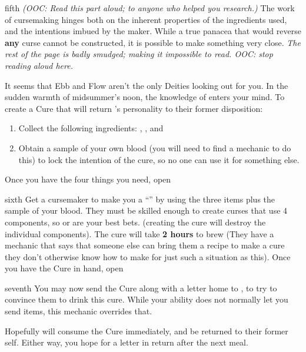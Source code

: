\documentclass[notebook]{GL2020} %
\begin{document}
\begin{page}{fifth}
\emph{(OOC: Read this part aloud; to anyone who helped you research.)} The work of cursemaking hinges both on the inherent properties of the ingredients used, and the intentions imbued by the maker. While a true panacea that would reverse \textbf{any} curse cannot be constructed, it is possible to make something very close. \emph{The rest of the page is badly smudged; making it impossible to read. OOC: stop reading aloud here.}

It seems that Ebb and Flow aren’t the only Deities looking out for you. In the sudden warmth of midsummer’s noon, the knowledge of \cFarmGod{} enters your mind. To create a Cure that will return \cLoud{}’s personality to their former disposition:
\begin{enumerate}
	\item Collect the following ingredients: \iFish{}, \iCharcoal{}, and \iSight{}
	\item  Obtain a sample of your own blood (you will need to find a mechanic to do this) to lock the intention of the cure, so no one can use it for something else.
\end{enumerate}

Once you have the four things you need, open 
\end{page}

\begin{page}{sixth}
Get a cursemaker to make you a ``\iPanacea{}'' by using the three items plus the sample of your blood. They must be skilled enough to create curses that use 4 components, so \cPrince{} or \cCurse{} are your best bets. (creating the cure will destroy the individual components). The cure will take \textbf{2 hours} to brew (They have a mechanic that says that someone else can bring them a recipe to make a cure they don’t otherwise know how to make for just such a situation as this). Once you have the Cure in hand, open 
\end{page}

\begin{page}{seventh}
You may now send the Cure along with a letter home to \cLoud{}, to try to convince them to drink this cure. While your ability does not normally let you send items, this mechanic overrides that.

Hopefully \cLoud{} will consume the Cure immediately, and be returned to their former self. Either way, you hope for a letter in return after the next meal.

\end{page}

\endnotebook
\end{document}
